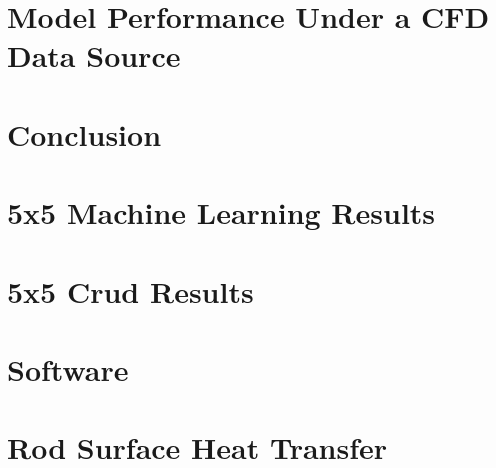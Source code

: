 \documentclass[12pt]{report}
\begin{document}
\chapter{Model Performance Under a CFD Data Source}
\label{chap:fw}


\chapter{Conclusion}
\label{chap:conc}


% 


\appendices
\chapter{5x5 Machine Learning Results}
\label{chap:app_ml}


\chapter{5x5 Crud Results}
\label{chap:app_b}


\chapter{Software}
\label{chap:app_c}


\chapter{Rod Surface Heat Transfer}
\label{chap:app_d}


\printindex


\end{document}
